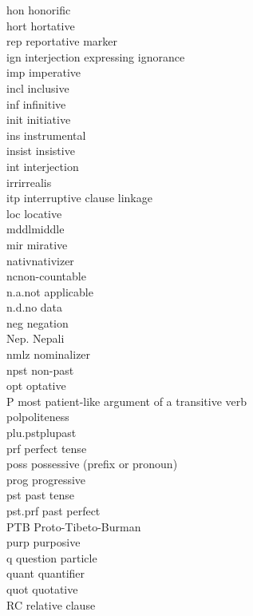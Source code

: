 \begin{refsection}
{\begin{tabbing}
{\sc hon}\> honorific\\
{\sc hort} \> hortative\\
{\sc rep}\> reportative marker\\
{\sc ign}\>  interjection expressing ignorance\\
{\sc imp} \> imperative\\
{\sc incl}\> inclusive\\
{\sc inf} \> infinitive\\
{\sc init} \> initiative\\
{\sc ins} \> instrumental\\
{\sc insist} \> insistive\\
{\sc int} \> interjection\\
{\sc irr}\>irrealis\\
{\sc itp} \> interruptive clause linkage\\
{\sc loc} 	 \> locative \\
{\sc mddl}\>middle\\
{\sc mir} \> mirative\\
{\sc nativ}\>nativizer\\
{\sc nc}\>non-countable\\
n.a.\>not applicable\\
n.d.\>no data\\
{\sc neg} \>	negation\\
Nep. \>	Nepali\\
{\sc nmlz} \>	nominalizer\\
{\sc npst} \> non-past\\
{\sc opt} \> optative\\
P 	\> most patient-like argument of a transitive verb\\
{\sc pol}\>politeness\\
{\sc plu.pst}\>plupast\\
{\sc prf}\> perfect tense\\
{\sc poss} \> possessive (prefix or pronoun)\\
{\sc prog} \> progressive\\
{\sc pst} \> past tense\\
{\sc pst.prf} \> past perfect\\
PTB \> Proto-Tibeto-Burman\\
{\sc purp}\> purposive\\
{\sc q} \> question particle\\
{\sc quant} \> quantifier\\
{\sc quot} \> quotative\\
{\sc RC} \> relative clause\\

\end{tabbing}}
\end{refsection}
